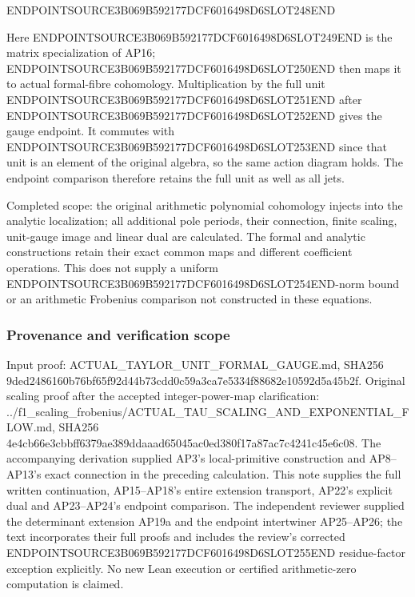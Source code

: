 ENDPOINTSOURCE3B069B592177DCF6016498D6SLOT248END

Here ENDPOINTSOURCE3B069B592177DCF6016498D6SLOT249END is the matrix specialization of AP16; ENDPOINTSOURCE3B069B592177DCF6016498D6SLOT250END then maps it to actual formal-fibre cohomology. Multiplication by the full unit ENDPOINTSOURCE3B069B592177DCF6016498D6SLOT251END after ENDPOINTSOURCE3B069B592177DCF6016498D6SLOT252END gives the gauge endpoint. It commutes with ENDPOINTSOURCE3B069B592177DCF6016498D6SLOT253END since that unit is an element of the original algebra, so the same action diagram holds. The endpoint comparison therefore retains the full unit as well as all jets.

Completed scope: the original arithmetic polynomial cohomology injects into the analytic localization; all additional pole periods, their connection, finite scaling, unit-gauge image and linear dual are calculated. The formal and analytic constructions retain their exact common maps and different coefficient operations. This does not supply a uniform ENDPOINTSOURCE3B069B592177DCF6016498D6SLOT254END-norm bound or an arithmetic Frobenius comparison not constructed in these equations.

\subsubsection{Provenance and verification scope}\label{endpoint-analytic_pole--provenance-and-verification-scope}

Input proof: ACTUAL\_TAYLOR\_UNIT\_FORMAL\_GAUGE.md, SHA256 9ded2486160b76bf65f92d44b73cdd0c59a3ca7e5334f88682e10592d5a45b2f. Original scaling proof after the accepted integer-power-map clarification: ../f1\_scaling\_frobenius/ACTUAL\_TAU\_SCALING\_AND\_EXPONENTIAL\_FLOW.md, SHA256 4e4cb66e3cbbff6379ae389ddaaad65045ac0ed380f17a87ac7c4241c45e6c08. The accompanying derivation supplied AP3's local-primitive construction and AP8--AP13's exact connection in the preceding calculation. This note supplies the full written continuation, AP15--AP18's entire extension transport, AP22's explicit dual and AP23--AP24's endpoint comparison. The independent reviewer supplied the determinant extension AP19a and the endpoint intertwiner AP25--AP26; the text incorporates their full proofs and includes the review's corrected ENDPOINTSOURCE3B069B592177DCF6016498D6SLOT255END residue-factor exception explicitly. No new Lean execution or certified arithmetic-zero computation is claimed.
